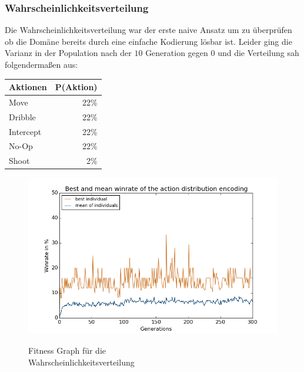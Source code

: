\newpage
            \subsubsection*{Wahrscheinlichkeitsverteilung}
                \begin{multicols}{2}
                    \noindent
                    Die Wahrscheinlichkeitsverteilung war der erste naive Ansatz um zu überprüfen ob die Domäne bereits durch eine einfache Kodierung lösbar ist. Leider ging die Varianz in der Population nach der $10$ Generation gegen $0$ und die Verteilung sah folgendermaßen aus:
                    \begin{table}[H]
                        \begin{center}
                        \begin{tabular}{ |l|r| } 
                            \hline
                            \hfill Aktionen & P(Aktion)  \\ \hline
                            Move      & 22\% \\ \hline
                            Dribble   & 22\% \\ \hline
                            Intercept & 22\% \\ \hline
                            No-Op     & 22\% \\ \hline
                            Shoot     &  2\% \\ \hline
                        \end{tabular}
                        \end{center}
                    \end{table}

                    \begin{figure}[H]
                        \includegraphics[scale=0.5]{../pictures/summary/actiondist-fitness.png}\\
                        \caption{Fitness Graph für die \\Wahrscheinlichkeitsverteilung}\label{fig:graph-ac}
                    \end{figure}
                \end{multicols}
